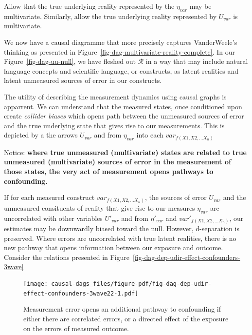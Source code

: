 \documentclass[
  singlecolumn]{report}
\begin{document}
Allow that the true underlying reality represented by the \(\eta_{var}\)
may be multivariate. Similarly, allow the true underlying reality
represented by \(U_{var}\) is multivariate.

We now have a causal diagramme that more precisely captures
VanderWeele's thinking as presented in
Figure~\ref{fig-dag-multivariate-reality-complete}. In our
Figure~\ref{fig-dag-uu-null}, we have fleshed out \(\mathcal{R}\) in a
way that may include natural language concepts and scientific language,
or constructs, as latent realities and latent unmeasured sources of
error in our constructs.

The utility of describing the measurement dynamics using causal graphs
is apparrent. We can understand that the measured states, once
conditioned upon create \emph{collider biases} which opens path between
the unmeasured sources of error and the true underlying state that gives
rise to our measurements. This is depicted by a the arrows \(U_{var}\)
and from \(\eta_{var}\) into each \(var_{f(X1, X2,\dots X_n)}\)

Notice: \textbf{where true unmeasured (multivariate) states are related
to true unmeasured (multivariate) sources of error in the measurement of
those states, the very act of measurement opens pathways to
confounding.}

If for each measured construct \(var_{f(X1, X2,\dots X_n)}\), the
sources of error \(U_{var}\) and the unmeasured consituents of reality
that give rise to our measures \(\eta_{var}\) are uncorrelated with
other variables \(U\prime_{var}\) and from \(\eta\prime_{var}\) and
\(var\prime_{f(X1, X2,\dots X_n)}\), our estimates may be downwardly
biased toward the null. However, d-separation is preserved. Where errors
are uncorrelated with true latent realities, there is no new pathway
that opens information between our exposure and outcome. Consider the
relations presented in
Figure~\ref{fig-dag-dep-udir-effect-confounders-3wave}

\begin{figure}

{\centering \texttt{[image: causal-dags\_files/figure-pdf/fig-dag-dep-udir-effect-confounders-3wave22-1.pdf]}

}

\caption{\label{fig-dag-dep-udir-effect-confounders-3wave22}Measurement
error opens an additional pathway to confounding if either there are
correlated errors, or a directed effect of the exposure on the errors of
measured outcome.}

\end{figure}
\end{document}

